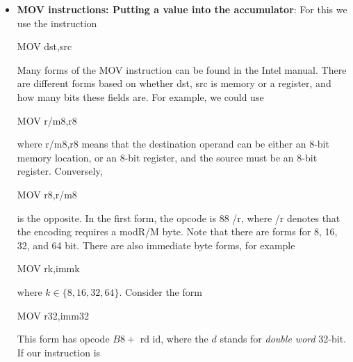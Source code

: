 \documentclass{report}
\begin{document}
\begin{itemize}
\begin{itemize}
                \item \textbf{Doubleword (dword)}:	32 bits
                \item \textbf{Quadword (qword)}:	64 bits
                \item \textbf{Double quadword (dqword / xmmword)}:	128 bits
                \item \textbf{YMM word}:	256 bits
                \item \textbf{ZMM word}:	512 bits
            \end{itemize}
        \item \textbf{MOV instructions: Putting a value into the accumulator}: For this we use the instruction
            \bigbreak \noindent 
            \begin{cppcode}
            MOV     dst,src
            \end{cppcode}
            \bigbreak \noindent 
            Many forms of the MOV instruction can be found in the Intel manual. There are different forms based on whether dst, src is memory or a register, and how many bits these fields are. For example, we could use
            \bigbreak \noindent 
            \begin{cppcode}
            MOV    r/m8,r8
            \end{cppcode}
            \bigbreak \noindent 
            where r/m8,r8 means that the destination operand can be either an 8-bit memory location, or an 8-bit register, and the source must be an 8-bit register. Conversely,
            \bigbreak \noindent 
            \begin{cppcode}
            MOV    r8,r/m8
            \end{cppcode}
            \bigbreak \noindent 
            is the opposite. In the first form, the opcode is 88 /r, where /r denotes that the encoding requires a modR/M byte. 
            \bigbreak \noindent 
            Note that there are forms for 8, 16, 32, and 64 bit. There are also immediate byte forms, for example
            \bigbreak \noindent 
            \begin{cppcode}
            MOV    rk,immk 
            \end{cppcode}
            \bigbreak \noindent 
            where $k\in \{8,16,32,64\} $. Consider the form
            \bigbreak \noindent 
            \begin{cppcode}
            MOV r32,imm32
            \end{cppcode}
            \bigbreak \noindent 
            This form has opcode $B8 + \text{ rd id} $, where the $d$ stands for \textit{double word} 32-bit.  If our instruction is

\end{itemize}
\end{document}
